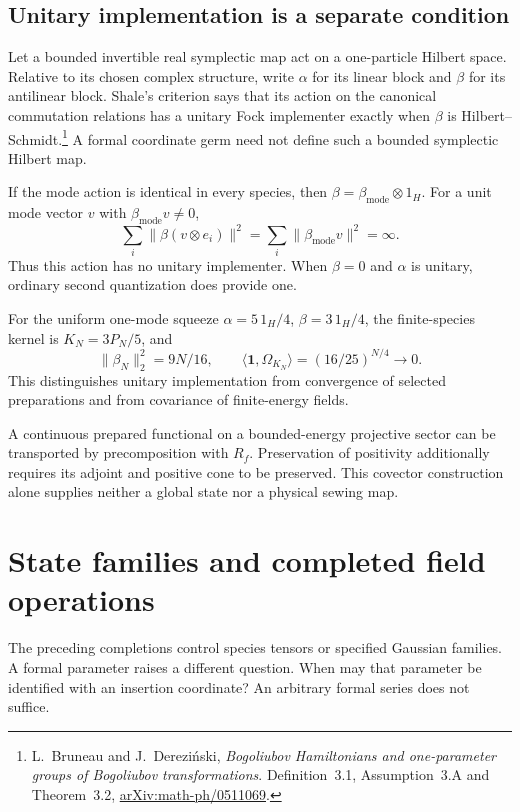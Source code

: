 \subsection{Unitary implementation is a separate condition}

Let a bounded invertible real symplectic
map act on a one-particle Hilbert space.
Relative to its chosen complex structure,
write \(\alpha\) for its linear block
and \(\beta\) for its antilinear block.
Shale's criterion says that its action
on the canonical commutation relations
has a unitary Fock implementer exactly
when \(\beta\) is Hilbert--Schmidt.\footnote{
L.~Bruneau and J.~Dereziński,
\emph{Bogoliubov Hamiltonians and one-parameter groups
of Bogoliubov transformations}.
Definition~3.1, Assumption~3.A and Theorem~3.2,
\href{https://arxiv.org/abs/math-ph/0511069}{arXiv:math-ph/0511069}.}
A formal coordinate germ need not define
such a bounded symplectic Hilbert map.

If the mode action is identical in every
species, then
\(\beta=\beta_{\mathrm{mode}}\otimes1_H\).
For a unit mode vector \(v\) with
\(\beta_{\mathrm{mode}}v\ne0\),
\[
 \sum_i\|\beta(v\otimes e_i)\|^2
            =\sum_i\|\beta_{\mathrm{mode}}v\|^2=\infty.
\]
Thus this action has no unitary implementer.
When \(\beta=0\) and \(\alpha\) is unitary,
ordinary second quantization does provide one.

For the uniform one-mode squeeze
\(\alpha=5\,1_H/4\), \(\beta=3\,1_H/4\),
the finite-species kernel is \(K_N=3P_N/5\), and
\[
 \|\beta_N\|_2^2=9N/16,\qquad
 \langle\mathbf1,\Omega_{K_N}\rangle=(16/25)^{N/4}\longrightarrow0.
\]
This distinguishes unitary implementation
from convergence of selected preparations
and from covariance of finite-energy fields.

A continuous prepared functional on a
bounded-energy projective sector can be
transported by precomposition with \(R_f\).
Preservation of positivity additionally
requires its adjoint and positive cone
to be preserved. This covector construction
alone supplies neither a global state
nor a physical sewing map.

\section{State families and completed field operations}
\label{v4-sec:singular-state-families}

The preceding completions control species tensors
or specified Gaussian families. A formal parameter
raises a different question. When may that
parameter be identified with an insertion coordinate?
An arbitrary formal series does not suffice.

